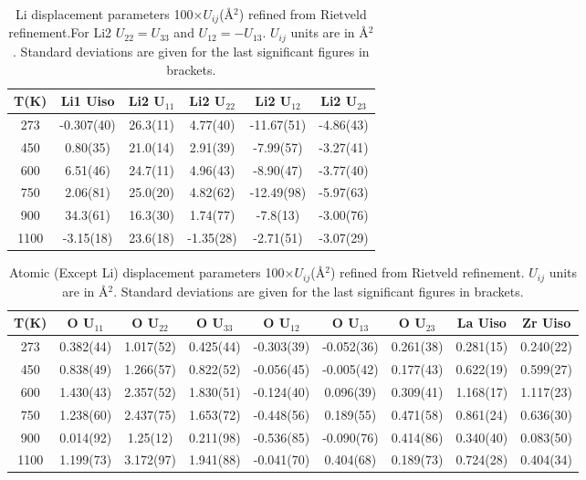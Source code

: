 \documentclass[twoside,twocolumn,9pt]{article}
\begin{document}
\begin{table}[h]
\centering
\caption{Li displacement parameters 100$\times U_{ij}$(\AA$^2$) refined from Rietveld refinement.For Li2 $U_{22} = U_{33}$ and $U_{12} = - U_{13}. 
$ $U_{ij}$ units are in \AA$^2$.
Standard deviations are given for the last significant figures in brackets. } 
\label{tab:Li_displacement_parameters}
\begin{tabular}{cccccc}
\hline
\hline
T(K)    & Li1 Uiso      & Li2 U$_{11}$ & Li2 U$_{22}$ & Li2 U$_{12}$ & Li2 U$_{23}$ \\
\hline
273     & -0.307(40)    & 26.3(11)     & 4.77(40)     & -11.67(51)   & -4.86(43)    \\
450     &  0.80(35)     & 21.0(14)     & 2.91(39)     & -7.99(57)    & -3.27(41)    \\
600     &  6.51(46)     & 24.7(11)     & 4.96(43)     & -8.90(47)    & -3.77(40)    \\
750     &  2.06(81)     & 25.0(20)     & 4.82(62)     & -12.49(98)   & -5.97(63)    \\
900     &  34.3(61)     & 16.3(30)     & 1.74(77)     & -7.8(13)     & -3.00(76)    \\
1100    & -3.15(18)     & 23.6(18)     &-1.35(28)     & -2.71(51)    & -3.07(29)    \\
\hline
\hline
\end{tabular}
\end{table}


\begin{table}[h]
\centering
\caption{Atomic (Except Li) displacement parameters 100$\times U_{ij}$(\AA$^2$) refined from Rietveld refinement. 
$U_{ij}$ units are in \AA$^2$.
Standard deviations are given for the last significant figures in brackets.  } 
\label{tab:atomic_parameters}
\begin{tabular}{ccccccccc}
\hline
\hline
T(K)   & O U$_{11}$ & O U$_{22}$ & O U$_{33}$ & O U$_{12}$ & O U$_{13}$ & O U$_{23}$  & La Uiso    & Zr Uiso    \\
\hline
273    & 0.382(44)  & 1.017(52)  & 0.425(44)  & -0.303(39) & -0.052(36) & 0.261(38)   & 0.281(15)  & 0.240(22)  \\
450    & 0.838(49)  & 1.266(57)  & 0.822(52)  & -0.056(45) & -0.005(42) & 0.177(43)   & 0.622(19)  & 0.599(27)  \\
600    & 1.430(43)  & 2.357(52)  & 1.830(51)  & -0.124(40) &  0.096(39) & 0.309(41)   & 1.168(17)  & 1.117(23)  \\
750    & 1.238(60)  & 2.437(75)  & 1.653(72)  & -0.448(56) &  0.189(55) & 0.471(58)   & 0.861(24)  & 0.636(30)  \\
900    & 0.014(92)  & 1.25(12)   & 0.211(98)  & -0.536(85) & -0.090(76) & 0.414(86)   & 0.340(40)  & 0.083(50)  \\
1100   & 1.199(73)  & 3.172(97)  & 1.941(88)  & -0.041(70) &  0.404(68) & 0.189(73)   & 0.724(28)  & 0.404(34)  \\
\hline
\hline
\end{tabular}
\end{table}
\end{document}
